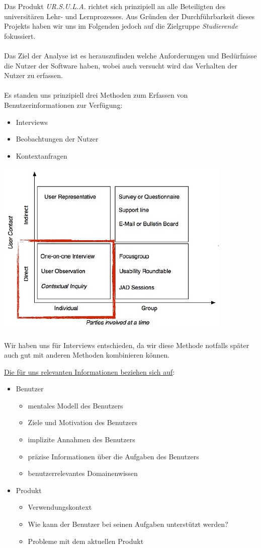 \documentclass{article}
\begin{document}
Das Produkt \textit{UR.S.U.L.A.} richtet sich prinzipiell an alle Beteiligten des universitären Lehr- und Lernprozesses. Aus Gründen der Durchführbarkeit dieses Projekts haben wir uns im Folgenden jedoch auf die Zielgruppe \textit{Studierende} fokussiert.\\
\\
Das Ziel der Analyse ist es herauszufinden welche Anforderungen und Bedürfnisse die Nutzer der Software haben, wobei auch versucht wird das Verhalten der Nutzer zu erfassen.\\
\\
Es standen uns prinzipiell drei Methoden zum Erfassen von Benutzerinformationen zur Verfügung:
\begin{itemize}
\item Interviews
\item Beobachtungen der Nutzer
\item Kontextanfragen
\end{itemize}
\includegraphics{data_generation_methods.jpg}\\
\\
Wir haben uns für Interviews entschieden, da wir diese Methode notfalls später auch gut mit anderen Methoden kombinieren können.

\newpage

\underline{Die für uns relevanten Informationen beziehen sich auf}:
\begin{itemize}
\item Benutzer
	\begin{itemize}
	\item mentales Modell des Benutzers
	\item Ziele und Motivation des Benutzers
	\item implizite Annahmen des Benutzers
	\item präzise Informationen über die Aufgaben des Benutzers
	\item benutzerrelevantes Domainenwissen
	\end{itemize}
\item Produkt
	\begin{itemize}
	\item Verwendungskontext
	\item Wie kann der Benutzer bei seinen Aufgaben unterstützt werden?
	\item Probleme mit dem aktuellen Produkt
	\end{itemize}
\end{itemize}
\end{document}

